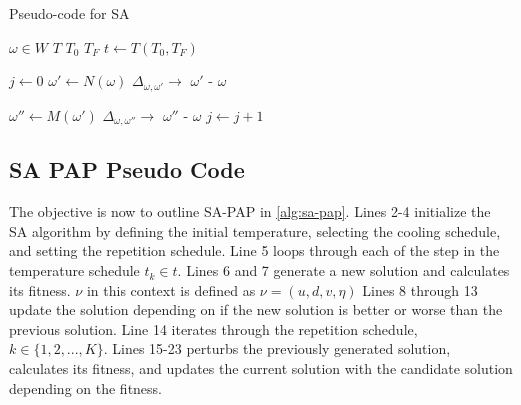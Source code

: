 \documentclass[11pt,a4paper,final]{article}
\begin{document}
\begin{algorithm}[H]
\caption{Pseudo-code for SA} \label{alg:sa-pseudo}
    \LinesNumbered

    \Begin
    {
        $\omega \in W$ 
        $T$ 
        $T_0$ 
        $T_F$ 
        $t \leftarrow T(T_0, T_F)$ 

        {
            $j \leftarrow 0$ 
            $\omega' \leftarrow N(\omega)$ 
            $\Delta_{\omega,\omega'} \rightarrow$ \f{$\omega'$} - \f{$\omega$} 

            {
                $\omega{''} \leftarrow M(\omega')$ 
                $\Delta_{\omega,\omega{''}} \rightarrow$ \f{$\omega{''}$} - \f{$\omega$} 
                $j \leftarrow j+1$\;
            }
        }
    }
\end{algorithm}

\subsection{SA PAP Pseudo Code}
\label{sec:sa-pap-pseudo-code}
The objective is now to outline SA-PAP in \ref{alg:sa-pap}. Lines 2-4 initialize the SA algorithm by defining the
initial temperature, selecting the cooling schedule, and setting the repetition schedule. Line 5 loops through each of
the step in the temperature schedule \(t_k \in t\). Lines 6 and 7 generate a new solution and calculates its fitness. \(\nu\) in
this context is defined as \(\nu = (u, d, v, \eta)\) Lines 8 through 13 update the solution depending on if the new solution is
better or worse than the previous solution. Line 14 iterates through the repetition schedule, \(k \in \{1, 2, ..., K\}\).
Lines 15-23 perturbs the previously generated solution, calculates its fitness, and updates the current solution with
the candidate solution depending on the fitness.
\end{document}
